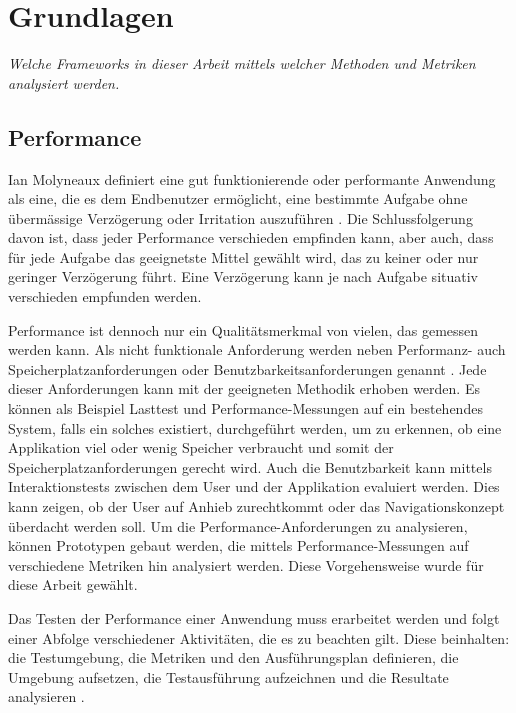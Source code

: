\documentclass[main.tex]{subfiles}
\begin{document}

\chapter{Grundlagen}

\textit{Welche Frameworks in dieser Arbeit mittels welcher Methoden und Metriken analysiert werden.}




\section{Performance} 

Ian Molyneaux definiert eine  gut funktionierende oder performante Anwendung als eine, die es dem Endbenutzer ermöglicht, eine bestimmte Aufgabe ohne übermässige Verzögerung oder Irritation auszuführen \cite[Kap.~1]{molyneaux2014art}.
Die Schlussfolgerung davon ist, dass jeder Performance verschieden empfinden kann, aber auch, dass für jede Aufgabe das geeignetste Mittel gewählt wird, das zu keiner oder nur geringer Verzögerung führt. Eine Verzögerung kann je nach Aufgabe situativ verschieden empfunden werden.

Performance ist dennoch nur ein Qualitätsmerkmal von vielen, das gemessen werden kann. Als nicht funktionale Anforderung werden neben Performanz- auch Speicherplatzanforderungen oder Benutzbarkeitsanforderungen genannt \cite[S. 120]{sommerville_2012}. Jede dieser Anforderungen kann mit der geeigneten Methodik erhoben werden. Es können als Beispiel Lasttest und Performance-Messungen auf ein bestehendes System, falls ein solches existiert, durchgeführt werden, um zu erkennen, ob eine Applikation viel oder wenig Speicher verbraucht und somit der Speicherplatzanforderungen gerecht wird. Auch die Benutzbarkeit kann mittels Interaktionstests zwischen dem User und der Applikation evaluiert werden. Dies kann zeigen, ob der User auf Anhieb zurechtkommt oder das Navigationskonzept überdacht werden soll. Um die Performance-Anforderungen zu analysieren, können Prototypen gebaut werden, die mittels Performance-Messungen auf verschiedene Metriken hin analysiert werden. Diese Vorgehensweise wurde für diese Arbeit gewählt.

Das Testen der Performance einer Anwendung muss erarbeitet werden und folgt einer Abfolge verschiedener Aktivitäten, die es zu beachten gilt. Diese beinhalten: die Testumgebung, die Metriken und den Ausführungsplan definieren, die Umgebung aufsetzen, die Testausführung aufzeichnen und die Resultate analysieren  \cite[vgl.~Kap.~1]{erinle_2013}. 
\end{document}
